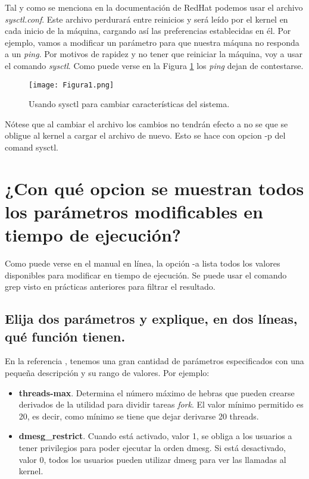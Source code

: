 Tal y como se menciona en la documentación de RedHat\cite{sysctlconf} podemos usar el archivo \textit{sysctl.conf}. Este archivo perdurará entre 
reinicios y será leído por el kernel en cada inicio de la máquina, cargando así las preferencias establecidas en él. Por ejemplo, vamos a 
modificar un parámetro para que nuestra máquna no responda a un \textit{ping}. Por motivos de rapidez y no tener que reiniciar la máquina, voy a 
usar el comando \textit{sysctl}. Como puede verse en la Figura \ref{fig:figura1} los \textit{ping} dejan de contestarse.

\begin{figure}[H] 
\centering
\texttt{[image: Figura1.png]}  
\caption{Usando sysctl para cambiar características del sistema.}\label{fig:figura1}
\end{figure}

Nótese que al cambiar el archivo los cambios no tendrán efecto a no se que se obligue al kernel a cargar el archivo de nuevo. Esto se hace con 
opcion -p del comand sysctl\cite{mansysctl}.



\vspace{5mm}


\section{¿Con qué opcion se muestran todos los parámetros modificables en tiempo de ejecución?}

Como puede verse en el manual en línea\cite{mansysctl}, la opción -a lista todos los valores disponibles para modificar en tiempo de ejecución. 
Se puede usar el comando grep visto en prácticas anteriores para filtrar el resultado.

\subsection{Elija dos parámetros y explique, en dos líneas, qué función tienen.}

En la referencia \cite{modparam}, tenemos una gran cantidad de parámetros especificados con una pequeña descripción y su rango
de valores. Por ejemplo:

\begin{itemize}
	\item \textbf{threads-max}. Determina el número máximo de hebras que pueden crearse derivados de la utilidad para dividir 
tareas \textit{fork}. El valor mínimo permitido es 20, es decir, como mínimo se tiene que dejar derivarse 20 threads.
	\item \textbf{dmesg\_restrict}. Cuando está activado, valor 1, se obliga a los usuarios a tener privilegios para poder ejecutar
	la orden dmesg. Si está desactivado, valor  0, todos los usuarios pueden utilizar dmesg para ver las llamadas al kernel.
\end{itemize}

